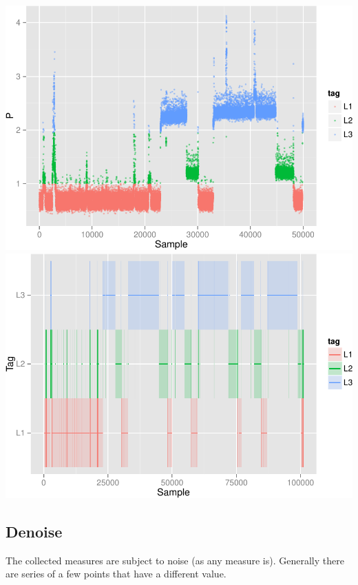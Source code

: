 \documentclass[]{article}
\begin{document}
\includegraphics{AnalysisProcedure_files/figure-latex/tagged_data-1.pdf}
\includegraphics{AnalysisProcedure_files/figure-latex/tagged_data-2.pdf}

\subsection{Denoise}\label{denoise}

The collected measures are subject to noise (as any measure is).
Generally there are series of a few points that have a different value.
\end{document}
